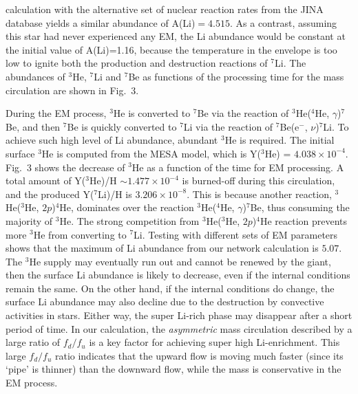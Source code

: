 \documentclass[twoside,onecolumnm,12pt]{article}
\newcommand{\upcite}[1]{\textsuperscript{\textsuperscript{\cite{#1}}}}
\begin{document}
calculation with the alternative set of nuclear reaction rates from
the JINA database\upcite{Cyburt2010} yields a similar abundance of
A(Li)$= 4.515$. As a contrast, assuming this star had never experienced any EM, 
the Li abundance would be constant at the initial value of A(Li)=1.16, 
because the temperature in the envelope is too low to ignite both the 
production and destruction reactions of $^7$Li. The abundances of 
$^3$He, $^7$Li and $^7$Be as functions of the processing time for the 
mass circulation are shown in Fig.~3.


During the EM process, $^3$He is converted to $^7$Be via the
reaction of $^3$He($^4$He, $\gamma$)$^7$Be, and then $^7$Be is
quickly converted to $^7$Li via the reaction of $^7$Be(e$^-$,
$\nu$)$^7$Li.
To achieve such high level of Li abundance, abundant $^3$He is
required. The initial surface $^3$He is computed from the MESA
model, which is Y($^3$He) = $4.038\times10^{-4}$. Fig.~3
shows the decrease of $^3$He as a function of the time for EM
processing. A total amount of Y($^3$He)/H $\sim1.477\times10^{-4}$ is
burned-off during this circulation, and the produced Y($^7$Li)/H is
$3.206\times10^{-8}$. This is because another reaction,
$^3$He($^3$He, $2p$)$^4$He, dominates over the reaction
$^3$He($^4$He, $\gamma$)$^7$Be, thus consuming the majority of
$^3$He. The strong competition from $^3$He($^3$He, $2p$)$^4$He
reaction prevents more $^3$He from converting to $^7$Li. Testing
with different sets of EM parameters shows that the maximum of Li
abundance from our network calculation is $5.07$.
The $^3$He supply may eventually run out and cannot be renewed by
the giant, then the surface Li abundance is likely to decrease, even
if the internal conditions remain the same. On the other hand, if
the internal conditions do change, the surface Li abundance may also
decline due to the destruction by convective activities in stars.
Either way, the super Li-rich phase may disappear after a short
period of time.
In our calculation, the \emph{asymmetric} mass circulation described
by a large ratio of $f_d/f_u$ is a key factor for achieving super
high Li-enrichment. This large $f_d/f_u$ ratio indicates that the
upward flow is moving much faster (since its `pipe' is thinner) than
the downward flow, while the mass is conservative in the EM process.
\end{document}
